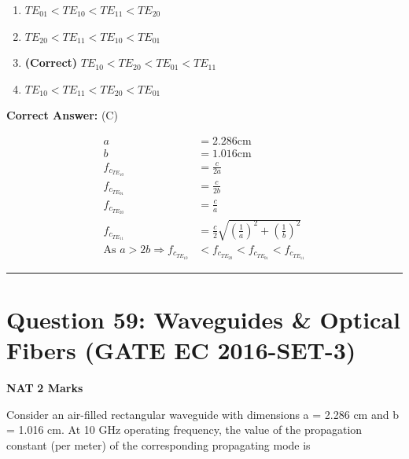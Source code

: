 \documentclass[11pt,a4paper]{article}
\begin{document}
\begin{enumerate}[label=(\Alph*)]
    \item $TE_{01} < TE_{10} < TE_{11} < TE_{20}$
    \item $TE_{20} < TE_{11} < TE_{10} < TE_{01}$
    \item \textbf{(Correct)} $TE_{10} < TE_{20} < TE_{01} < TE_{11}$
    \item $TE_{10} < TE_{11} < TE_{20} < TE_{01}$
\end{enumerate}

\noindent \textbf{Correct Answer:} (C)

\begin{tcolorbox}[solbox, title=Detailed Solution -- Question 58]
\[
\begin{aligned} a &=2.286 \mathrm{cm} \\ b &=1.016 \mathrm{cm} \\ f_{c_{T E_{10}}} &=\frac{c}{2 a} \\ f_{c_{T E_{01}}} &=\frac{c}{2 b} \\ f_{c_{T E_{20}}} &=\frac{c}{a} \\ f_{c_{T E_{11}}} &=\frac{c}{2} \sqrt{\left(\frac{1}{a}\right)^{2}+\left(\frac{1}{b}\right)^{2}} \\ \text{As }a > 2 b \Rightarrow f_{c_{T E_{10}}} & < f_{c_{T E_{20}}} < f_{c_{T E_{01}}} < f_{c_{T E_{11}}} \end{aligned}
\]
\end{tcolorbox}

\vspace{1.5em}
\hrule
\vspace{1.5em}

\section*{Question 59: Waveguides \& Optical Fibers (GATE EC 2016-SET-3)}
\noindent \textbf{\color{primary}NAT} \hfill \textbf{\color{secondary}2 Marks}


\noindent Consider an air-filled rectangular waveguide with dimensions a = 2.286 cm and b = 1.016 cm. At 10 GHz operating frequency, the value of the propagation constant (per meter) of the corresponding propagating mode is \underline{\hspace{1.5cm}}
\end{document}
